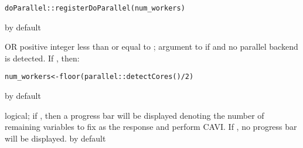 \documentclass[a4paper]{book}
\begin{document}
\begin{Arguments}
\begin{ldescription}
\begin{alltt}doParallel::registerDoParallel(num_workers)
\end{alltt}


 by default

\item[\code{num\_workers}]  OR positive integer less than or equal to
; argument to  if
 and no parallel backend is detected. If , then:

\begin{alltt}num_workers <- floor(parallel::detectCores() / 2)
\end{alltt}


 by default

\item[\code{prog\_bar}] logical; if , then a progress bar will be displayed
denoting the number of remaining variables to fix as the response and perform
CAVI. If , no progress bar will be displayed.  by default
\end{ldescription}
\end{Arguments}
%
\end{document}
